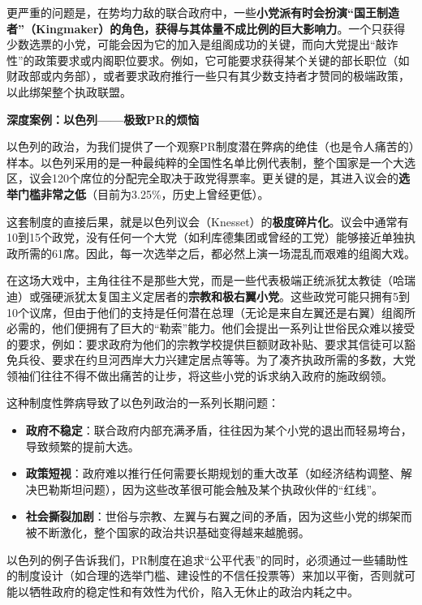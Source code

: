 更严重的问题是，在势均力敌的联合政府中，一些\textbf{小党派有时会扮演“国王制造者”（Kingmaker）的角色，获得与其体量不成比例的巨大影响力}。一个只获得少数选票的小党，可能会因为它的加入是组阁成功的关键，而向大党提出“敲诈性”的政策要求或内阁职位要求。例如，它可能要求获得某个关键的部长职位（如财政部或内务部），或者要求政府推行一些只有其少数支持者才赞同的极端政策，以此绑架整个执政联盟。

\textbf{深度案例：以色列——极致PR的烦恼}

以色列的政治，为我们提供了一个观察PR制度潜在弊病的绝佳（也是令人痛苦的）样本。以色列采用的是一种最纯粹的全国性名单比例代表制，整个国家是一个大选区，议会120个席位的分配完全取决于政党得票率。更关键的是，其进入议会的\textbf{选举门槛非常之低}（目前为3.25\%，历史上曾经更低）。

这套制度的直接后果，就是以色列议会（Knesset）的\textbf{极度碎片化}。议会中通常有10到15个政党，没有任何一个大党（如利库德集团或曾经的工党）能够接近单独执政所需的61席。因此，每一次选举之后，都必然上演一场混乱而艰难的组阁大戏。

在这场大戏中，主角往往不是那些大党，而是一些代表极端正统派犹太教徒（哈瑞迪）或强硬派犹太复国主义定居者的\textbf{宗教和极右翼小党}。这些政党可能只拥有5到10个议席，但由于他们的支持是任何潜在总理（无论是来自左翼还是右翼）组阁所必需的，他们便拥有了巨大的“勒索”能力。他们会提出一系列让世俗民众难以接受的要求，例如：要求政府为他们的宗教学校提供巨额财政补贴、要求其信徒可以豁免兵役、要求在约旦河西岸大力兴建定居点等等。为了凑齐执政所需的多数，大党领袖们往往不得不做出痛苦的让步，将这些小党的诉求纳入政府的施政纲领。

这种制度性弊病导致了以色列政治的一系列长期问题：

\begin{itemize}
    \item \textbf{政府不稳定}：联合政府内部充满矛盾，往往因为某个小党的退出而轻易垮台，导致频繁的提前大选。
    \item \textbf{政策短视}：政府难以推行任何需要长期规划的重大改革（如经济结构调整、解决巴勒斯坦问题），因为这些改革很可能会触及某个执政伙伴的“红线”。
    \item \textbf{社会撕裂加剧}：世俗与宗教、左翼与右翼之间的矛盾，因为这些小党的绑架而被不断激化，整个国家的政治共识基础变得越来越脆弱。
\end{itemize}

以色列的例子告诉我们，PR制度在追求“公平代表”的同时，必须通过一些辅助性的制度设计（如合理的选举门槛、建设性的不信任投票等）来加以平衡，否则就可能以牺牲政府的稳定性和有效性为代价，陷入无休止的政治内耗之中。

